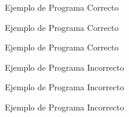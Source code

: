 \begin{figure}
    \caption{Ejemplo de Programa Correcto}
    \label{fig: corr1}
\end{figure}

\begin{figure}
    \caption{Ejemplo de Programa Correcto}
    \label{fig: corr2}
\end{figure}

\begin{figure}
    \caption{Ejemplo de Programa Correcto}
    \label{fig: corr3}
\end{figure}

\begin{figure}
    \caption{Ejemplo de Programa Incorrecto}
    \label{fig: incorr1}
\end{figure}

\begin{figure}
    \caption{Ejemplo de Programa Incorrecto}
    \label{fig: incorr2}
\end{figure}

\begin{figure}
    \caption{Ejemplo de Programa Incorrecto}
    \label{fig: incorr3}
\end{figure}

\label{appendixC}
